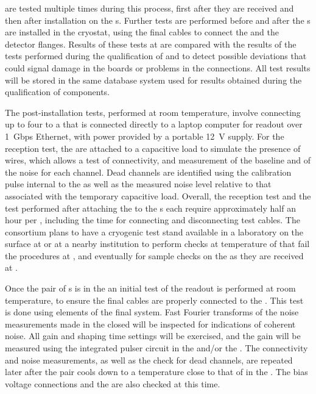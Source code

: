  are tested multiple times during this process,  
first after they are received and then 
after 
installation on the s. Further 
tests are performed before and after the 
s are installed in the cryostat, using the final cables to connect the  and the detector flanges. 
Results of these tests at  are compared with the results of the
tests performed during the qualification of  and
 to detect possible deviations that could signal 
damage in the boards or problems in the connections. All test 
results will be stored in the same database system used for
results obtained during the qualification of components.

The post-installation  tests, %
performed at room temperature,  %
involve connecting up to four  to a  that is 
connected directly to a laptop computer for readout over 1~Gbps
Ethernet, with power provided by a portable 12~V supply. For 
the reception test, the  are attached to a capacitive 
load to simulate the presence of wires, which allows a test of connectivity, %
and measurement of the baseline and \rms of the noise for 
each channel. Dead channels are identified using the calibration  pulse internal to the   as well as the measured
noise level relative to that associated with the temporary capacitive load.
Overall, the reception test and the test performed after attaching the
 to the s each require approximately half an hour per , %
including  the time for connecting and disconnecting test cables.
The  consortium plans to have a cryogenic test stand available
in a laboratory on the surface at  or at a nearby institution to perform checks at \lntwo temperature
of  that fail the  procedures at ,
and eventually for sample checks on the  as they are received
at .

Once the pair of s is in the \coldbox an initial test of the readout is performed at room temperature, to ensure the final cables are
properly connected to the . This test is done using elements of the final  system.
Fast Fourier transforms of
the noise measurements made in the closed \coldbox will be inspected for indications
of coherent noise. All  gain and shaping time settings will be exercised,
and the gain will be measured using the integrated pulser circuit in the 
 and/or the . The connectivity and noise measurements, as well
as the check for dead channels, are repeated later after the  pair cools
down to a temperature close to that of \lntwo in the \coldbox. The bias voltage
connections and the  are also checked at this time.

